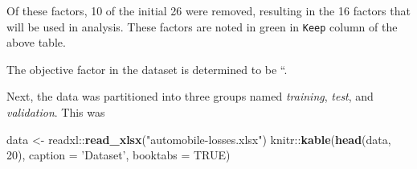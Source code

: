 \documentclass[12pt,]{book}
\newenvironment{Shaded}{\begin{snugshade}}{\end{snugshade}}
\newcommand{\KeywordTok}[1]{\textcolor[rgb]{0.13,0.29,0.53}{\textbf{{#1}}}}
\newcommand{\DataTypeTok}[1]{\textcolor[rgb]{0.13,0.29,0.53}{{#1}}}
\newcommand{\DecValTok}[1]{\textcolor[rgb]{0.00,0.00,0.81}{{#1}}}
\newcommand{\StringTok}[1]{\textcolor[rgb]{0.31,0.60,0.02}{{#1}}}
\newcommand{\OtherTok}[1]{\textcolor[rgb]{0.56,0.35,0.01}{{#1}}}
\newcommand{\NormalTok}[1]{{#1}}
\theoremstyle{definition}
\theoremstyle{definition}
\theoremstyle{remark}
\begin{document}
Of these factors, 10 of the initial 26 were removed, resulting in the 16
factors that will be used in analysis. These factors are noted in green
in \texttt{Keep} column of the above table.

The objective factor in the dataset is determined to be ``.

Next, the data was partitioned into three groups named \emph{training},
\emph{test}, and \emph{validation}. This was

\begin{Shaded}
\begin{Highlighting}[]
\NormalTok{data <-}\StringTok{ }\NormalTok{readxl::}\KeywordTok{read_xlsx}\NormalTok{(}\StringTok{"automobile-losses.xlsx"}\NormalTok{)}
\NormalTok{knitr::}\KeywordTok{kable}\NormalTok{(}\KeywordTok{head}\NormalTok{(data, }\DecValTok{20}\NormalTok{), }\DataTypeTok{caption =} \StringTok{'Dataset'}\NormalTok{, }\DataTypeTok{booktabs =} \OtherTok{TRUE}\NormalTok{)}
\end{Highlighting}
\end{Shaded}
\end{document}
